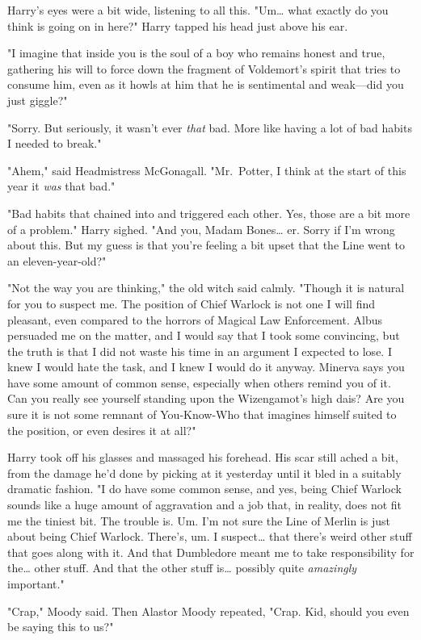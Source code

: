 Harry's eyes were a bit wide, listening to all this. "Um{\ldots} what exactly
do you think is going on in here?" Harry tapped his head just above his ear.

"I imagine that inside you is the soul of a boy who remains honest and true,
gathering his will to force down the fragment of Voldemort's spirit that tries
to consume him, even as it howls at him that he is sentimental and weak---did
you just giggle?"

"Sorry. But seriously, it wasn't ever \emph{that} bad. More like having a lot
of bad habits I needed to break."

"Ahem," said Headmistress McGonagall. "Mr.~Potter, I think at the start of this
year it \emph{was} that bad."

"Bad habits that chained into and triggered each other. Yes, those are a bit
more of a problem." Harry sighed. "And you, Madam Bones{\ldots} er. Sorry if
I'm wrong about this. But my guess is that you're feeling a bit upset that the
Line went to an eleven-year-old?"

"Not the way you are thinking," the old witch said calmly. "Though it is
natural for you to suspect me. The position of Chief Warlock is not one I will
find pleasant, even compared to the horrors of Magical Law Enforcement. Albus
persuaded me on the matter, and I would say that I took some convincing, but
the truth is that I did not waste his time in an argument I expected to lose. I
knew I would hate the task, and I knew I would do it anyway. Minerva says you
have some amount of common sense, especially when others remind you of it. Can
you really see yourself standing upon the Wizengamot's high dais? Are you sure
it is not some remnant of You-Know-Who that imagines himself suited to the
position, or even desires it at all?"

Harry took off his glasses and massaged his forehead. His scar still ached a
bit, from the damage he'd done by picking at it yesterday until it bled in a
suitably dramatic fashion. "I do have some common sense, and yes, being Chief
Warlock sounds like a huge amount of aggravation and a job that, in reality,
does not fit me the tiniest bit. The trouble is. Um. I'm not sure the Line of
Merlin is just about being Chief Warlock. There's, um. I suspect{\ldots} that
there's weird other stuff that goes along with it. And that Dumbledore meant me
to take responsibility for the{\ldots} other stuff. And that the other stuff
is{\ldots} possibly quite \emph{amazingly} important."

"Crap," Moody said. Then Alastor Moody repeated, "Crap. Kid, should you even be
saying this to us?"

